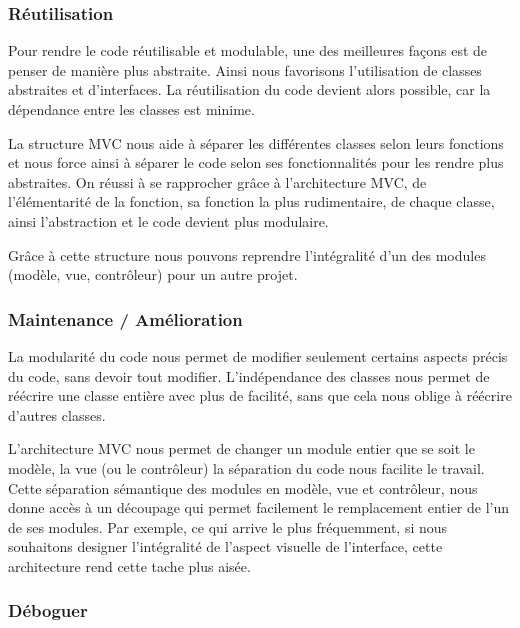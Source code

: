 \documentclass[french]{article}
\begin{document}
  \subsubsection{Réutilisation }



    Pour rendre le code réutilisable et modulable, une des meilleures façons
    est de penser de manière plus abstraite. Ainsi nous favorisons l'utilisation
    de classes abstraites et d'interfaces. La réutilisation du code devient
    alors possible, car la dépendance entre les classes est minime.

    La structure MVC nous aide à séparer les différentes classes selon
    leurs fonctions et nous force ainsi à séparer le code selon ses
    fonctionnalités pour les rendre plus abstraites. On réussi à se rapprocher
    grâce à l'architecture MVC, de l'élémentarité de la fonction, sa fonction la plus rudimentaire,
    de chaque classe, ainsi l'abstraction et le code devient plus modulaire.

    Grâce à cette structure nous pouvons reprendre l'intégralité d'un des modules
    (modèle, vue, contrôleur) pour un autre projet.


  \subsubsection{Maintenance / Amélioration}

    La modularité du code nous permet de modifier seulement certains aspects
    précis du code, sans devoir tout modifier. L'indépendance des classes
    nous permet de réécrire une classe entière avec plus de facilité,
    sans que cela nous oblige à réécrire d'autres classes.

    L'architecture MVC nous permet de changer un module entier que
    se soit le modèle, la vue (ou le contrôleur) la séparation du code
    nous facilite le travail. Cette séparation sémantique des modules
    en modèle, vue et contrôleur, nous donne accès à un découpage qui
    permet facilement le remplacement entier de l'un de ses modules. Par
    exemple, ce qui arrive le plus fréquemment, si nous souhaitons designer
    l'intégralité de l'aspect visuelle de l'interface, cette architecture rend cette tache
    plus aisée.


  \subsubsection{Déboguer}
\end{document}
